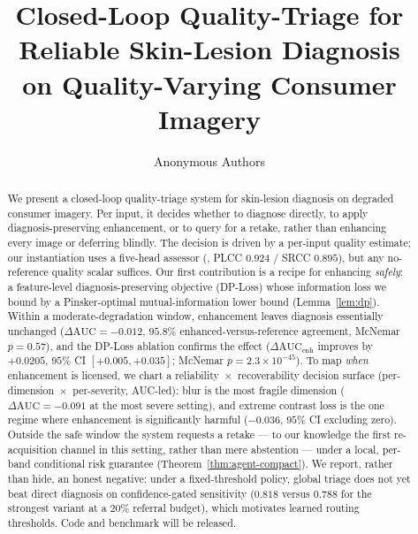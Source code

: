 \documentclass{article}
\title{Closed-Loop Quality-Triage for Reliable Skin-Lesion Diagnosis\\
on Quality-Varying Consumer Imagery}
\author{Anonymous Authors}
\date{}
\begin{document}
\maketitle

\begin{abstract}
We present a closed-loop quality-triage system for skin-lesion diagnosis on degraded consumer
imagery. Per input, it decides whether to diagnose directly, to apply diagnosis-preserving
enhancement, or to query for a retake, rather than enhancing every image or deferring blindly. The
decision is driven by a per-input quality estimate; our instantiation uses a five-head assessor
(\visiscore, PLCC $0.924$ / SRCC $0.895$), but any no-reference quality scalar suffices. Our first
contribution is a recipe for enhancing \emph{safely}: a feature-level diagnosis-preserving objective
(DP-Loss) whose information loss we bound by a Pinsker-optimal mutual-information lower bound
(Lemma~\ref{lem:dp}). Within a moderate-degradation window, enhancement leaves diagnosis essentially
unchanged ($\Delta\mathrm{AUC}=-0.012$, $95.8\%$ enhanced-versus-reference agreement, McNemar
$p=0.57$), and the DP-Loss ablation confirms the effect ($\Delta\mathrm{AUC}_{\text{enh}}$ improves by
$+0.0205$, $95\%$ CI $[+0.005,+0.035]$; McNemar $p=2.3\times10^{-45}$). To map \emph{when} enhancement
is licensed, we chart a reliability~$\times$~recoverability decision surface (per-dimension~$\times$~per-severity,
AUC-led): blur is the most fragile dimension ($\Delta\mathrm{AUC}=-0.091$ at the most severe setting),
and extreme contrast loss is the one regime where enhancement is significantly harmful ($-0.036$,
$95\%$ CI excluding zero). Outside the safe window the system requests a retake --- to our knowledge
the first re-acquisition channel in this setting, rather than mere abstention --- under a local,
per-band conditional risk guarantee (Theorem~\ref{thm:agent-compact}). We report, rather than hide, an
honest negative: under a fixed-threshold policy, global triage does not yet beat direct diagnosis on
confidence-gated sensitivity ($0.818$ versus $0.788$ for the strongest variant at a $20\%$ referral
budget), which motivates learned routing thresholds. Code and benchmark will be released.
\end{abstract}




\end{document}
